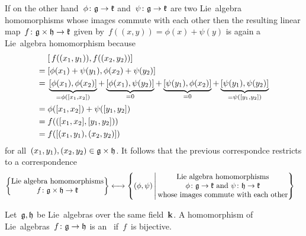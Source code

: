 \begin{example}
  If on the other hand~$\phi \colon \mathfrak{g} \to \mathfrak{k}$ and~$\psi \colon \mathfrak{g} \to \mathfrak{k}$ are two Lie~algebra homomorphisms whose images commute with each other then the resulting linear map~$f \colon \mathfrak{g} \times \mathfrak{h} \to \mathfrak{k}$ given by~$f((x,y)) = \phi(x) + \psi(y)$ is again a Lie~algebra homomorphism because
  \begin{align*}
    {}&
    [\, f((x_1, y_1)), f((x_2, y_2)) ]
    \\
    ={}&
    [ \phi(x_1) + \psi(y_1), \phi(x_2) + \psi(y_2) ]
    \\
    ={}&
      \underbrace{ [ \phi(x_1), \phi(x_2) ] }_{= \phi([x_1, x_2])}
    + \underbrace{ [ \phi(x_1), \psi(y_2) ] }_{= 0}
    + \underbrace{ [ \psi(y_1), \phi(x_2) ] }_{= 0}
    + \underbrace{ [ \psi(y_1), \psi(y_2) ] }_{= \psi([y_1, y_2])}
    \\
    ={}&
    \phi( [x_1, x_2] ) + \psi( [y_1, y_2] )
    \\
    ={}&
    f( ([x_1, x_2], [y_1, y_2]) )
    \\
    ={}&
    f( [(x_1, y_1), (x_2, y_2)] )
  \end{align*}
  for all~$(x_1, y_1), (x_2, y_2) \in \mathfrak{g} \times \mathfrak{h}$.
  It follows that the previous {\onetoone} correspondce restricts to a {\onetoone} correspondence
  \begin{align*}
    \left\{
      \begin{tabular}{@{}c@{}}
        Lie~algebra homomorphisms \\
        $f \colon \glie \times \hlie \to \klie$
      \end{tabular}
    \right\}
    &\longonetoone
    \left\{
      (\phi, \psi)
    \suchthat*
      \begin{tabular}{@{}c@{}}
        Lie~algebra homomorphisms \\
        $\phi \colon \glie \to \klie$ and~$\psi \colon \hlie \to \klie$ \\
        whose images commute with each other
      \end{tabular}
    \right\}
  \end{align*}
\end{example}


\begin{definition}
 Let~$\mathfrak{g}, \mathfrak{h}$ be Lie~algebras over the same field~$\mathbf{k}$.
 A homomorphism of Lie~algebras~$f \colon \mathfrak{g} \to \mathfrak{h}$ is an~ if~$f$~is bijective.
\end{definition}


